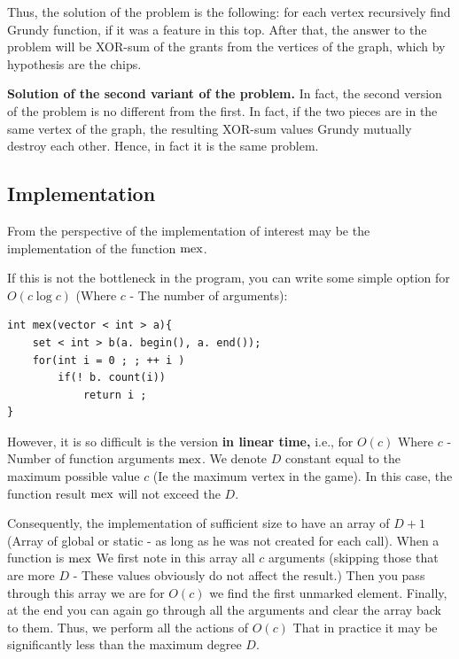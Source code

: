 Thus, the solution of the problem is the following: for each vertex recursively find Grundy function, if it was a feature in this top. After that, the answer to the problem will be XOR-sum of the grants from the vertices of the graph, which by hypothesis are the chips.

\textbf{Solution of the second variant of the problem.} In fact, the second version of the problem is no different from the first. In fact, if the two pieces are in the same vertex of the graph, the resulting XOR-sum values ​​Grundy mutually destroy each other. Hence, in fact it is the same problem.

\subsection{ Implementation }

From the perspective of the implementation of interest may be the implementation of the function $\rm mex$.

If this is not the bottleneck in the program, you can write some simple option for $O (c \log c)$ (Where $c$ - The number of arguments):

\begin{verbatim}
int mex(vector < int > a){
    set < int > b(a. begin(), a. end());
    for(int i = 0 ; ; ++ i )
        if(! b. count(i))
            return i ;
} 
\end{verbatim}
However, it is so difficult is the version \textbf{in linear time,} i.e., for $O (c)$ Where $c$ - Number of function arguments $\rm mex$. We denote $D$ constant equal to the maximum possible value $c$ (Ie the maximum vertex in the game). In this case, the function result $\rm mex$ will not exceed the $D$.

Consequently, the implementation of sufficient size to have an array of $D +1$ (Array of global or static - as long as he was not created for each call). When a function is $\rm mex$ We first note in this array all $c$ arguments (skipping those that are more $D$ - These values ​​obviously do not affect the result.) Then you pass through this array we are for $O (c)$ we find the first unmarked element. Finally, at the end you can again go through all the arguments and clear the array back to them. Thus, we perform all the actions of $O (c)$ That in practice it may be significantly less than the maximum degree $D$.

